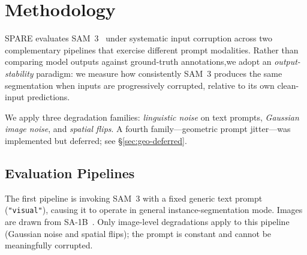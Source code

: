 \documentclass[10pt,twocolumn,letterpaper]{article}
\begin{document}
\section{Methodology}
\label{sec:method}
SPARE evaluates SAM~3~\cite{peng2025sam3} under systematic input corruption across two complementary pipelines that exercise different prompt modalities. Rather than comparing model outputs against ground-truth annotations,we adopt an \emph{output-stability} paradigm: we measure how consistently SAM~3 produces the same segmentation when inputs are progressively
corrupted, relative to its own clean-input predictions.

We apply three degradation families: \emph{linguistic noise} on text prompts,
\emph{Gaussian image noise}, and \emph{spatial flips}.  A fourth family---geometric prompt jitter---was implemented but deferred; see
\S\ref{sec:geo-deferred}.



\subsection{Evaluation Pipelines}
The first pipeline is invoking SAM~3 with a fixed generic text prompt (\texttt{"visual"}), causing it to operate in general instance-segmentation mode. Images are drawn from
SA-1B~\cite{kirillov2023sam}. Only image-level degradations apply to this pipeline (Gaussian noise and spatial flips); the prompt is constant and cannot
be meaningfully corrupted.
\end{document}
